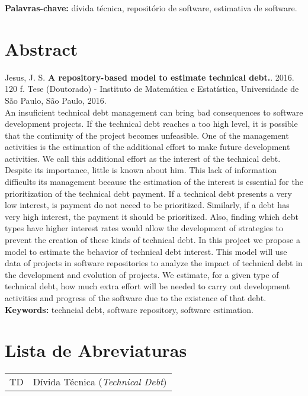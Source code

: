 \documentclass[11pt,twoside,a4paper]{book}
\begin{document}
\noindent \textbf{Palavras-chave:} dívida técnica, repositório de software, estimativa de software.

\chapter*{Abstract}
\noindent Jesus, J. S. \textbf{A repository-based model to estimate technical debt.}. 
2016. 120 f.
Tese (Doutorado) - Instituto de Matemática e Estatística,
Universidade de São Paulo, São Paulo, 2016.
\\


An insuficient technical debt management can bring bad consequences to software development projects. If the technical debt reaches a too high level, it is possible that the continuity of the project becomes unfeasible.
One of the management activities is the estimation of the additional effort  to make future development activities. We call this additional effort as the  interest of the technical debt. Despite its importance, little is known about him. This lack of information difficults its management because the estimation of the interest is essential for the prioritization of the technical debt payment. If a technical debt presents a very low interest, is payment do not neeed to be prioritized. Similarly, if a debt has very high interest, the payment it should be prioritized. Also, finding which debt types have higher interest rates would allow the development of strategies to prevent the creation of these kinds of technical debt. In this project we propose a model to estimate the behavior of technical debt interest. This model will use data of  projects in software repositories to analyze the impact of technical debt in the development and evolution of projects. We estimate, for a given type of technical debt, how much extra effort will be needed to carry out development activities and progress of the software due to the existence of that debt.
\\

\noindent \textbf{Keywords:} techncial debt, software repository, software estimation.

\tableofcontents    %

\chapter{Lista de Abreviaturas}
\begin{tabular}{ll}
         TD         & Dívida Técnica (\emph{Technical Debt})\\
         
\end{tabular}
\end{document}
